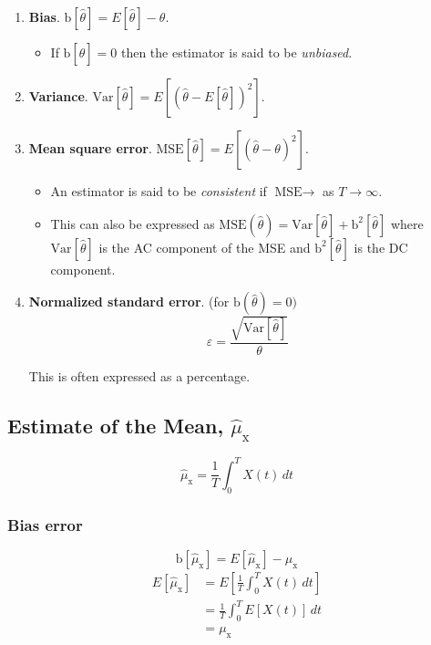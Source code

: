 \documentclass[12pt]{book}
\theoremstyle{definition}
\begin{document}
\begin{enumerate}
    \item \textbf{Bias}.  \(\text{b}[\hat{\theta}] = E[\hat{\theta}] - \theta\). 
    \begin{itemize}
        \item If \(\text{b}[\hat{\theta}] = 0\) then the estimator is said to be \emph{unbiased}.
    \end{itemize}
    

    \item \textbf{Variance}.  \(\text{Var}[\hat{\theta}] = E[(\hat{\theta} - E[\hat{\theta}])^2]\).

    \item \textbf{Mean square error}. \(\text{MSE}[\hat{\theta}] = E[(\hat{\theta} - \theta)^2]\).
    \begin{itemize}
        \item  An estimator is said to be \emph{consistent} if $\text{MSE} \rightarrow$ as \(T\rightarrow \infty\).
        \item This can also be expressed as  \(\text{MSE}(\hat{\theta}) = \text{Var}[\hat{\theta}] + \text{b}^2[\hat{\theta}]\) where $\text{Var}[\hat{\theta}]$ is the AC component of the MSE and \(\text{b}^2[\hat{\theta}]\) is the DC component.
    \end{itemize}
   
    \item \textbf{Normalized standard error}. (for \(\text{b}(\hat{\theta}) = 0)\)
    \[
    \varepsilon = \frac{\sqrt{\text{Var}[\hat{\theta}]}}{\theta}
    \]

    This is often expressed as a percentage.
\end{enumerate}

\subsection{Estimate of the Mean, $\hat{\mu}_\mathrm{x}$}

\[
\hat{\mu}_\mathrm{x} = \frac{1}{T}\int_{0}^T
X(t) \, dt
\]
\subsubsection*{Bias error}

\[
\text{b}[\hat{\mu}_\mathrm{x}] = E[\hat{\mu}_\mathrm{x}] -  \mu_\mathrm{x}
\]
\[
\begin{aligned}
    E[\hat{\mu}_\mathrm{x}]  & = E \left [ \frac{1}{T} \int_0^T X(t) \, dt \right ] \\
    & =  \frac{1}{T} \int_0^T E \left [ X(t) \right ] \, dt \\ 
    & = \mu_\mathrm{x}
\end{aligned}
\]
\end{document}
